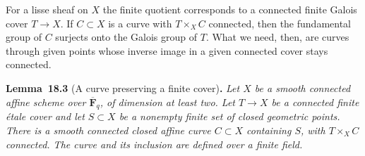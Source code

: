 \documentclass[11pt]{article}
\newenvironment{bpstatement}[2]{\par\addvspace{0.6\baselineskip}\noindent\textbf{#1}#2\textbf{.}\enspace\ignorespaces}
  {\par\addvspace{0.4\baselineskip}}
\newenvironment{bpstatementit}[2]{\begin{bpstatement}{#1}{#2}\itshape\ignorespaces}{\end{bpstatement}}
\begin{document}
\label{bp280}%
For a lisse sheaf on \(X\) the finite quotient corresponds to a connected finite Galois cover \(T\to X\). If \(C\subset X\) is a curve with \(T\times_XC\) connected, then the fundamental group of \(C\) surjects onto the Galois group of \(T\). What we need, then, are curves through given points whose inverse image in a given connected cover stays connected.

\label{bp281}%
\begin{bpstatementit}{Lemma~18.3}{ (A curve preserving a finite cover)}
Let \(X\) be a smooth connected affine scheme over \(\overline{\mathbf F}_q\), of dimension at least two. Let \(T\to X\) be a connected finite étale cover and let \(S\subset X\) be a nonempty finite set of closed geometric points. There is a smooth connected closed affine curve \(C\subset X\) containing \(S\), with \(T\times_XC\) connected. The curve and its inclusion are defined over a finite field.
\end{bpstatementit}
\end{document}
